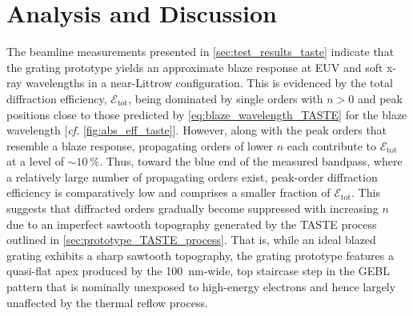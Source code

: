 \section{Analysis and Discussion}\label{sec:discussion_taste}
The beamline measurements presented in \cref{sec:test_results_taste} indicate that the grating prototype yields an approximate blaze response at EUV and soft x-ray wavelengths in a near-Littrow configuration.  
This is evidenced by the total diffraction efficiency, $\mathscr{E}_{\text{tot}}$, being dominated by single orders with $n > 0$ and peak positions close to those predicted by \cref{eq:blaze_wavelength_TASTE} for the blaze wavelength [\emph{cf.\@} \cref{fig:abs_eff_taste}]. 
However, along with the peak orders that resemble a blaze response, propagating orders of lower $n$ each contribute to $\mathscr{E}_{\text{tot}}$ at a level of $\sim \SI{10}{\percent}$. 
Thus, toward the blue end of the measured bandpass, where a relatively large number of propagating orders exist, peak-order diffraction efficiency is comparatively low and comprises a smaller fraction of $\mathscr{E}_{\text{tot}}$. %
This suggests that diffracted orders gradually become suppressed with increasing $n$ due to an imperfect sawtooth topography generated by the TASTE process outlined in \cref{sec:prototype_TASTE_process}. 
That is, while an ideal blazed grating exhibits a sharp sawtooth topography, the grating prototype features a quasi-flat apex produced by the \SI{100}{\nm}-wide, top staircase step in the GEBL pattern that is nominally unexposed to high-energy electrons and hence largely unaffected by the thermal reflow process. %

